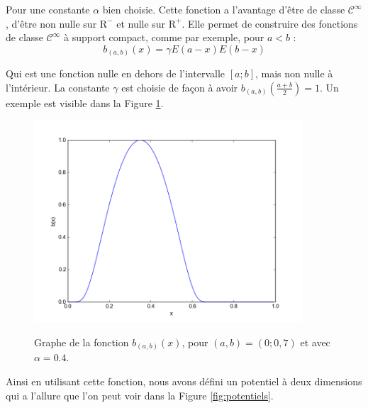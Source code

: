 \documentclass[11pt]{article}
\theoremstyle{definition}
\theoremstyle{remark}
\begin{document}
Pour une constante $\alpha$ bien choisie. Cette fonction a l'avantage d'être de classe $\mathcal{C}^{\infty}$, d'être non nulle sur $\mathrm{R}^{-}$ et nulle sur $\mathrm{R}^{+}$. Elle permet de construire des fonctions de classe $\mathcal{C}^{\infty}$ à support compact, comme par exemple, pour $a<b$ : 
\begin{equation}
\label{eq:blip}
b_{(a,b)}(x)=\gamma E(a-x)E(b-x)
\end{equation}

Qui est une fonction nulle en dehors de l'intervalle $[a;b]$, mais non nulle à l'intérieur. La constante $\gamma$ est choisie de façon à avoir $b_{(a,b)}(\frac{a+b}{2})=1$. Un exemple est visible dans la Figure \ref{fig:blip}.

\begin{figure}[h]
\begin{center}
\label{fig:blip}
\includegraphics[width=10cm]{blip.png}
\caption{Graphe de la fonction $b_{(a,b)}(x)$, pour $(a,b)=(0;0,7)$ et avec $\alpha=0.4$.}
\end{center}
\end{figure}

Ainsi en utilisant cette fonction, nous avons défini un potentiel à deux dimensions qui a l'allure que l'on peut voir dans la Figure \ref{fig:potentiels}. 
\end{document}
